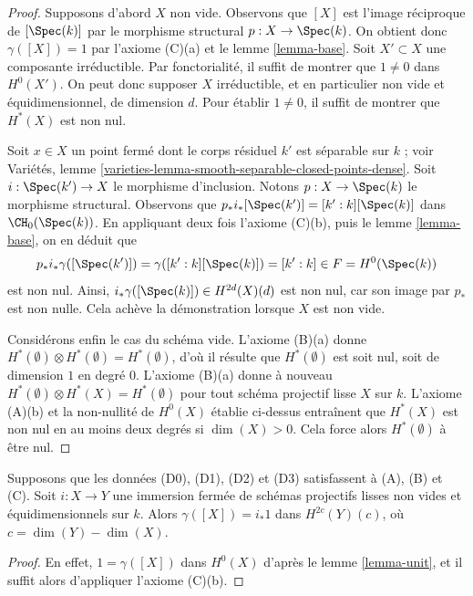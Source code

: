 \begin{proof}
Supposons d'abord $X$ non vide.
Observons que $[X]$ est l'image réciproque de $[\Spec(k)]$ par le morphisme structural
$p : X \to \Spec(k)$. On obtient donc $\gamma([X]) = 1$ par l'axiome (C)(a)
et le lemme \ref{lemma-base}. Soit $X' \subset X$ une composante irréductible.
Par fonctorialité, il suffit de montrer que $1 \not = 0$ dans $H^0(X')$.
On peut donc supposer $X$ irréductible, et en particulier
non vide et équidimensionnel, de dimension $d$.
Pour établir $1 \not = 0$, il suffit de montrer que $H^*(X)$ est non nul.

\medskip\noindent
Soit $x \in X$ un point fermé dont le corps résiduel $k'$
est séparable sur $k$ ; voir
Variétés, lemme \ref{varieties-lemma-smooth-separable-closed-points-dense}.
Soit $i : \Spec(k') \to X$ le morphisme d'inclusion.
Notons $p : X \to \Spec(k)$ le morphisme structural.
Observons que
$p_*i_*[\Spec(k')] = [k' : k][\Spec(k)]$ dans $\CH_0(\Spec(k))$.
En appliquant deux fois l'axiome (C)(b), puis le lemme \ref{lemma-base},
on en déduit que
$$
p_*i_*\gamma([\Spec(k')]) = \gamma([k' : k][\Spec(k)]) = [k' : k]
\in F = H^0(\Spec(k))
$$
est non nul. Ainsi, $i_*\gamma([\Spec(k)]) \in H^{2d}(X)(d)$ est non nul,
car son image par $p_*$ est non nulle. Cela achève la démonstration
lorsque $X$ est non vide.

\medskip\noindent
Considérons enfin le cas du schéma vide. L'axiome (B)(a) donne
$H^*(\emptyset) \otimes H^*(\emptyset) = H^*(\emptyset)$,
d'où il résulte que $H^*(\emptyset)$ est soit nul, soit de dimension $1$
en degré $0$. L'axiome (B)(a) donne à nouveau
$H^*(\emptyset) \otimes H^*(X) = H^*(\emptyset)$ pour
tout schéma projectif lisse $X$ sur $k$. L'axiome (A)(b)
et la non-nullité de $H^0(X)$ établie ci-dessus
entraînent que $H^*(X)$ est non nul en au moins deux degrés
si $\dim(X) > 0$. Cela force alors $H^*(\emptyset)$ à être nul.
\end{proof}

\begin{lemma}
\label{lemma-push-unit}
Supposons que les données (D0), (D1), (D2) et (D3) satisfassent à (A), (B) et (C).
Soit $i : X \to Y$ une immersion fermée de schémas projectifs lisses
non vides et équidimensionnels sur $k$. Alors
$\gamma([X]) = i_*1$ dans $H^{2c}(Y)(c)$, où $c = \dim(Y) - \dim(X)$.
\end{lemma}

\begin{proof}
En effet, $1 = \gamma([X])$ dans $H^0(X)$ d'après le lemme \ref{lemma-unit},
et il suffit alors d'appliquer l'axiome (C)(b).
\end{proof}

